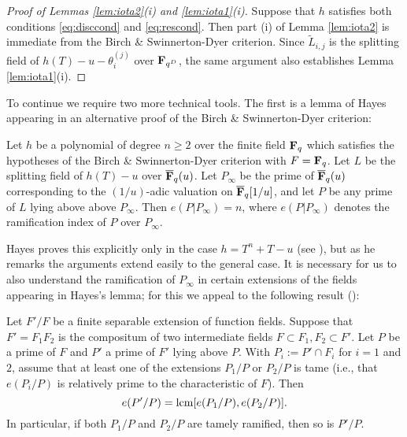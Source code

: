\documentclass[a4paper]{compositio}
\begin{document}
\begin{proof}[Proof of Lemmas \ref{lem:iota2}(i) and \ref{lem:iota1}(i)]
Suppose that $h$ satisfies both conditions \eqref{eq:disccond} and
\eqref{eq:rescond}. Then part (i) of Lemma \ref{lem:iota2} is
immediate from the Birch \& Swinnerton-Dyer criterion. Since
$\widetilde{L}_{i,j}$ is the splitting field of $h(T) - u -
\theta_i^{(j)}$ over $\mathbf{F}_{q^{D}}$, the same argument also
establishes Lemma \ref{lem:iota1}(i).\end{proof}

To continue we require two more technical tools. The first is a
lemma of Hayes appearing in an alternative proof of the Birch \&
Swinnerton-Dyer criterion:

\begin{lem}[(Hayes)]\label{lem:hayes} Let $h$ be a polynomial of degree $n \geq 2$ over
the finite field $\mathbf{F}_q$ which satisfies the hypotheses of the Birch
\& Swinnerton-Dyer criterion with $F = \mathbf{F}_q$. Let $L$ be the
splitting field of $h(T)-u$ over $\overline{\mathbf{F}}_q(u)$. Let
$P_{\infty}$ be the prime of $\overline{\mathbf{F}}_{q}(u)$ corresponding to
the $(1/u)$-adic valuation on $\overline{\mathbf{F}}_q[1/u]$, and let $P$ be
any prime of $L$ lying above above $P_{\infty}$. Then $e(P |
P_{\infty}) = n$, where $e(P|P_{\infty})$ denotes the ramification
index of $P$ over $P_{\infty}$.
\end{lem}
Hayes proves this explicitly only in the case $h = T^n + T-u$ (see
\cite[Proof of Lemma 1]{hayes73}), but as he remarks the arguments
extend easily to the general case. It is necessary for us to also
understand the ramification of $P_{\infty}$ in certain extensions of
the fields appearing in Hayes's lemma; for this we appeal to the
following result (\cite[Proposition III.8.9]{stichtenoth93}):

\begin{abh} Let $F'/F$ be a finite separable extension of function
fields. Suppose that $F' = F_1 F_2$ is the compositum of two
intermediate fields $F \subset F_1, F_2 \subset F'$. Let $P$ be a
prime of $F$ and $P'$ a prime of $F'$ lying above $P$. With $P_i :=
P' \cap F_i$ for $i=1$ and $2$, assume that at least one of the
extensions $P_1/P$ or $P_2/P$ is tame (i.e., that $e(P_i/P)$ is
relatively prime to the characteristic of $F$). Then
\[ e(P'/P) = \mathrm{lcm}[e(P_1/P), e(P_2/P)]. \]
In particular, if both $P_1/P$ and $P_2/P$ are tamely ramified, then
so is $P'/P$.
\end{abh}
\end{document}
